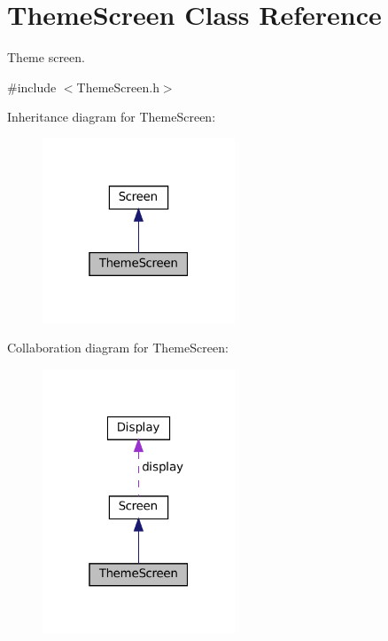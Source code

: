 \hypertarget{classThemeScreen}{}\section{Theme\+Screen Class Reference}
\label{classThemeScreen}


Theme screen.  




{\ttfamily \#include $<$Theme\+Screen.\+h$>$}



Inheritance diagram for Theme\+Screen\+:\nopagebreak
\begin{figure}[H]
\begin{center}
\leavevmode
\includegraphics[width=163pt]{classThemeScreen__inherit__graph}
\end{center}
\end{figure}


Collaboration diagram for Theme\+Screen\+:\nopagebreak
\begin{figure}[H]
\begin{center}
\leavevmode
\includegraphics[width=163pt]{classThemeScreen__coll__graph}
\end{center}
\end{figure}
